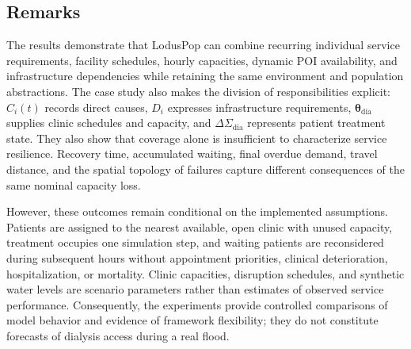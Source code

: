 \subsection{Remarks}

The results demonstrate that LodusPop can combine recurring individual service requirements, facility schedules, hourly capacities, dynamic POI availability, and infrastructure dependencies while retaining the same environment and population abstractions. The case study also makes the division of responsibilities explicit: $C_i(t)$ records direct causes, $D_i$ expresses infrastructure requirements, $\bm{\theta}_{\mathrm{dia}}$ supplies clinic schedules and capacity, and $\Delta\Sigma_{\mathrm{dia}}$ represents patient treatment state. They also show that coverage alone is insufficient to characterize service resilience. Recovery time, accumulated waiting, final overdue demand, travel distance, and the spatial topology of failures capture different consequences of the same nominal capacity loss.

However, these outcomes remain conditional on the implemented assumptions. Patients are assigned to the nearest available, open clinic with unused capacity, treatment occupies one simulation step, and waiting patients are reconsidered during subsequent hours without appointment priorities, clinical deterioration, hospitalization, or mortality. Clinic capacities, disruption schedules, and synthetic water levels are scenario parameters rather than estimates of observed service performance. Consequently, the experiments provide controlled comparisons of model behavior and evidence of framework flexibility; they do not constitute forecasts of dialysis access during a real flood.
